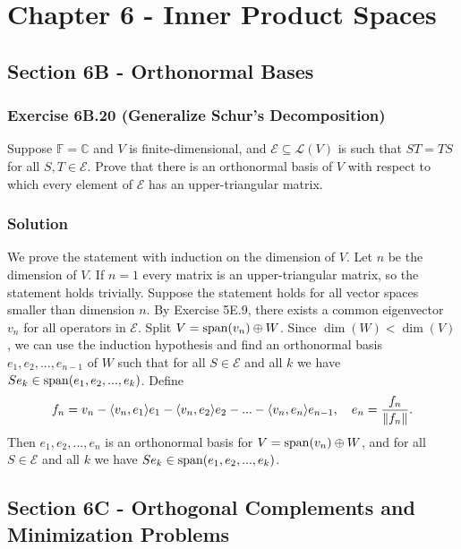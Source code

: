 \section*{Chapter 6 - Inner Product Spaces}


\subsection*{Section 6B - Orthonormal Bases}

\subsubsection*{Exercise 6B.20 (Generalize Schur's Decomposition)}

Suppose $\mathbb{F} = \mathbb{C}$ and $V$ is finite-dimensional, and $\mathcal{E} \subseteq \mathcal{L}(V)$ is such that $ST = TS$ for all $S, T \in \mathcal{E}$.
Prove that there is an orthonormal basis of $V$ with respect to which every element of $\mathcal{E}$ has an upper-triangular matrix.

\subsubsection*{Solution}

We prove the statement with induction on the dimension of $V$.
Let $n$ be the dimension of $V$.
If $n = 1$ every matrix is an upper-triangular matrix, so the statement holds trivially.
Suppose the statement holds for all vector spaces smaller than dimension $n$.
By Exercise 5E.9, there exists a common eigenvector $v_n$ for all operators in $\mathcal{E}$.
Split $V = \mathrm{span}(v_n) \oplus W$.
Since $\dim(W) < \dim(V)$, we can use the induction hypothesis and find an orthonormal basis $e_1, e_2, ..., e_{n-1}$ of $W$ such that for all $S \in \mathcal{E}$ and all $k$ we have $Se_k \in \mathrm{span}(e_1, e_2, ..., e_k)$.
Define
\begin{equation*}
    f_n = v_n - \langle v_n, e_1 \rangle e_1 - \langle v_n, e_2 \rangle e_2 - ... - \langle v_n, e_n \rangle e_{n-1}, \quad e_n = \frac{f_n}{\left\lVert f_n\right\rVert}.
\end{equation*}
Then $e_1, e_2, ..., e_n$ is an orthonormal basis for $V = \mathrm{span}(v_n) \oplus W$, and for all $S \in \mathcal{E}$ and all $k$ we have $Se_k \in \mathrm{span}(e_1, e_2, ..., e_k)$.


\subsection*{Section 6C - Orthogonal Complements and Minimization Problems}

